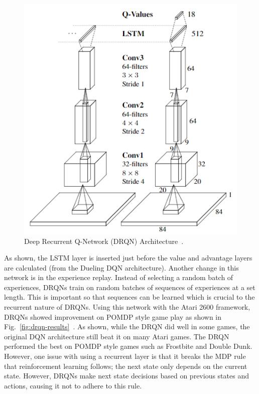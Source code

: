 \documentclass[12pt,american]{report}
\begin{document}
\begin{figure}
\centering
\includegraphics[scale=1]{images/drqn-arch.png}
\caption{Deep Recurrent Q-Network (DRQN) Architecture~\cite{HausknechtDRQN}.}
\label{fig:drqn-arch}
\end{figure}

As shown, the LSTM layer is inserted just before the value and advantage layers are calculated (from the Dueling DQN architecture). Another change in this network is in the experience replay.  Instead of selecting a random batch of experiences, DRQNs train on random batches of sequences of experiences at a set length.  This is important so that sequences can be learned which is crucial to the recurrent nature of DRQNs. Using this network with the Atari 2600 framework, DRQNs showed improvement on POMDP style game play as shown in Fig.~\ref{fig:drqn-results}~\cite{HausknechtDRQN}. As shown, while the DRQN did well in some games, the original DQN architecture still beat it on many Atari games. The DRQN performed the best on POMDP style games such as Frostbite and Double Dunk.  However, one issue with using a recurrent layer is that it breaks the MDP rule that reinforcement learning follows; the next state only depends on the current state.  However, DRQNs make next state decisions based on previous states and actions, causing it not to adhere to this rule.
\end{document}
